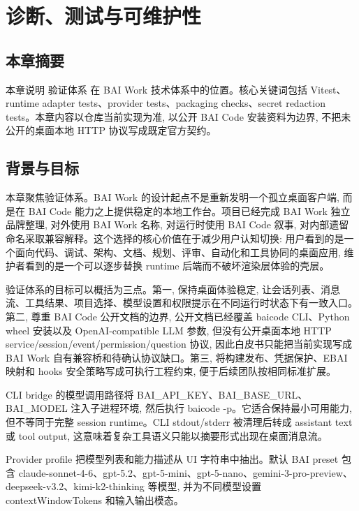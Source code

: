 \chapter{诊断、测试与可维护性}
\section{本章摘要}
本章说明 验证体系 在 BAI Work 技术体系中的位置。核心关键词包括 Vitest、runtime adapter tests、provider tests、packaging checks、secret redaction tests。本章内容以仓库当前实现为准, 以公开 BAI Code 安装资料为边界, 不把未公开的桌面本地 HTTP 协议写成既定官方契约。

\section{背景与目标}
本章聚焦验证体系。BAI Work 的设计起点不是重新发明一个孤立桌面客户端, 而是在 BAI Code 能力之上提供稳定的本地工作台。项目已经完成 BAI Work 独立品牌整理, 对外使用 BAI Work 名称, 对运行时使用 BAI Code 叙事, 对内部遗留命名采取兼容解释。这个选择的核心价值在于减少用户认知切换: 用户看到的是一个面向代码、调试、架构、文档、规划、评审、自动化和工具协同的桌面应用, 维护者看到的是一个可以逐步替换 runtime 后端而不破坏渲染层体验的壳层。

验证体系的目标可以概括为三点。第一, 保持桌面体验稳定, 让会话列表、消息流、工具结果、项目选择、模型设置和权限提示在不同运行时状态下有一致入口。第二, 尊重 BAI Code 公开文档的边界, 公开文档已经覆盖 baicode CLI、Python wheel 安装以及 OpenAI-compatible LLM 参数, 但没有公开桌面本地 HTTP service/session/event/permission/question 协议, 因此白皮书只能把当前实现写成 BAI Work 自有兼容桥和待确认协议缺口。第三, 将构建发布、凭据保护、EBAI 映射和 hooks 安全策略写成可执行工程约束, 便于后续团队按相同标准扩展。

CLI bridge 的模型调用路径将 BAI\_API\_KEY、BAI\_BASE\_URL、BAI\_MODEL 注入子进程环境, 然后执行 baicode -p。它适合保持最小可用能力, 但不等同于完整 session runtime。CLI stdout/stderr 被清理后转成 assistant text 或 tool output, 这意味着复杂工具语义只能以摘要形式出现在桌面消息流。

Provider profile 把模型列表和能力描述从 UI 字符串中抽出。默认 BAI preset 包含 claude-sonnet-4-6、gpt-5.2、gpt-5-mini、gpt-5-nano、gemini-3-pro-preview、deepseek-v3.2、kimi-k2-thinking 等模型, 并为不同模型设置 contextWindowTokens 和输入输出模态。

